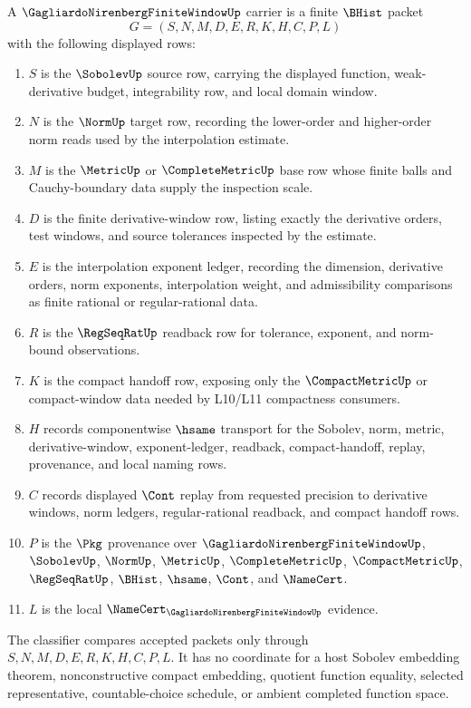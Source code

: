 \begin{definition}
\label{def:gagliardo-nirenberg-finite-window-carrier}
A $\GagliardoNirenbergFiniteWindowUp$ carrier is a finite $\BHist$ packet
$$
G=(S,N,M,D,E,R,K,H,C,P,L)
$$
with the following displayed rows:
\begin{enumerate}
\item $S$ is the $\SobolevUp$ source row, carrying the displayed function, weak-derivative budget, integrability row, and local domain window.
\item $N$ is the $\NormUp$ target row, recording the lower-order and higher-order norm reads used by the interpolation estimate.
\item $M$ is the $\MetricUp$ or $\CompleteMetricUp$ base row whose finite balls and Cauchy-boundary data supply the inspection scale.
\item $D$ is the finite derivative-window row, listing exactly the derivative orders, test windows, and source tolerances inspected by the estimate.
\item $E$ is the interpolation exponent ledger, recording the dimension, derivative orders, norm exponents, interpolation weight, and admissibility comparisons as finite rational or regular-rational data.
\item $R$ is the $\RegSeqRatUp$ readback row for tolerance, exponent, and norm-bound observations.
\item $K$ is the compact handoff row, exposing only the $\CompactMetricUp$ or compact-window data needed by L10/L11 compactness consumers.
\item $H$ records componentwise $\hsame$ transport for the Sobolev, norm, metric, derivative-window, exponent-ledger, readback, compact-handoff, replay, provenance, and local naming rows.
\item $C$ records displayed $\Cont$ replay from requested precision to derivative windows, norm ledgers, regular-rational readback, and compact handoff rows.
\item $P$ is the $\Pkg$ provenance over $\GagliardoNirenbergFiniteWindowUp$, $\SobolevUp$, $\NormUp$, $\MetricUp$, $\CompleteMetricUp$, $\CompactMetricUp$, $\RegSeqRatUp$, $\BHist$, $\hsame$, $\Cont$, and $\NameCert$.
\item $L$ is the local $\NameCert_{\GagliardoNirenbergFiniteWindowUp}$ evidence.
\end{enumerate}
The classifier compares accepted packets only through $S,N,M,D,E,R,K,H,C,P,L$. It has no coordinate for a host Sobolev embedding theorem, nonconstructive compact embedding, quotient function equality, selected representative, countable-choice schedule, or ambient completed function space.
\end{definition}

